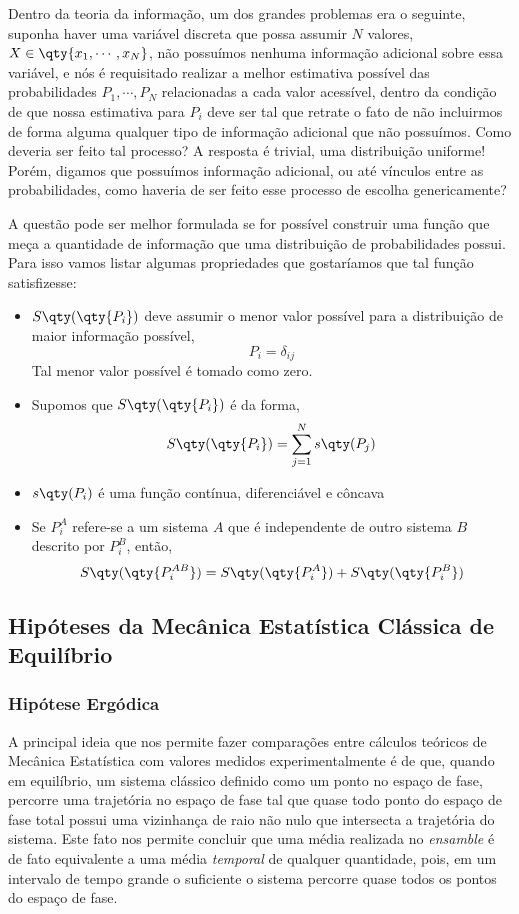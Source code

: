 \documentclass[twoside,reqno]{amsart}
\numberwithin{equation}{section}
\begin{document}
\begin{refsection}
Dentro da teoria da informação, um dos grandes problemas era o seguinte, suponha haver uma variável discreta que possa assumir $N$ valores, $X\in\qty{x_1,\cdots, x_N}$, não possuímos nenhuma informação adicional sobre essa variável, e nós é requisitado realizar a melhor estimativa possível das probabilidades $P_1,\cdots, P_N$ relacionadas a cada valor acessível, dentro da condição de que nossa estimativa para $P_i$ deve ser tal que retrate o fato de não incluirmos de forma alguma qualquer tipo de informação adicional que não possuímos. Como deveria ser feito tal processo? A resposta é trivial, uma distribuição uniforme! Porém, digamos que possuímos informação adicional, ou até vínculos entre as probabilidades, como haveria de ser feito esse processo de escolha genericamente?

A questão pode ser melhor formulada se for possível construir uma função que meça a quantidade de informação que uma distribuição de probabilidades possui. Para isso vamos listar algumas propriedades que gostaríamos que tal função satisfizesse:

\begin{itemize}
    \item $S\qty(\qty{P_i})$ deve assumir o menor valor possível para a distribuição de maior informação possível, $$P_i=\delta_{ij}$$ Tal menor valor possível é tomado como zero.
    \item Supomos que $S\qty(\qty{P_i})$ é da forma, $$S\qty(\qty{P_i})=\sum\limits_{j=1}^{N}s\qty(P_j)$$
    \item $s\qty(P_i)$ é uma função contínua, diferenciável e côncava
    \item Se $P^A_i$ refere-se a um sistema $A$ que é independente de outro sistema $B$ descrito por $P^B_i$, então,
    $$S\qty(\qty{P^{AB}_i})=S\qty(\qty{P^A_i})+S\qty(\qty{P^B_i})$$
\end{itemize}

\subsection{Hipóteses da Mecânica Estatística Clássica de Equilíbrio}

\subsubsection{Hipótese Ergódica}

A principal ideia que nos permite fazer comparações entre cálculos teóricos de Mecânica Estatística com 
valores medidos experimentalmente é de que, quando em equilíbrio, um sistema clássico definido como um ponto 
no espaço de fase, percorre uma trajetória no espaço de fase tal que quase todo ponto do espaço de fase 
total possui uma vizinhança de raio não nulo que intersecta a trajetória do sistema. Este fato nos permite 
concluir que uma média realizada no \emph{ensamble} é de fato equivalente a uma média \emph{temporal} de qualquer 
quantidade, pois, em um intervalo de tempo grande o suficiente o sistema percorre quase todos os pontos do 
espaço de fase. 


\end{refsection}
\end{document}
